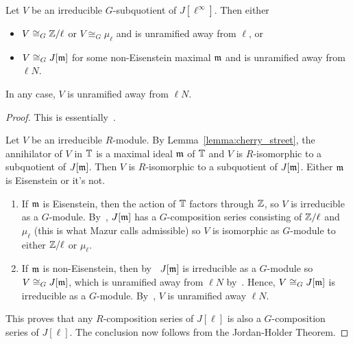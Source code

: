 \documentclass{article}
\begin{document}
\begin{theorem}[Mazur]\label{thm:irreducible_G_sub}
    Let $V$ be an irreducible $G$-subquotient of $J[\ell^\infty]$. Then either
    \begin{itemize}
        \item
            $V\cong_G \mathbb{Z}/\ell$ or $V\cong_G \mu_\ell$ and is unramified away
            from $\ell$, or
        \item 
            $V\cong_G J[\mathfrak{m}]$ for some non-Eisenstein maximal $\mathfrak{m}$ and is
            unramified away from $\ell N$.
    \end{itemize}
    In any case, $V$ is unramified away from $\ell N$.
\end{theorem}
\begin{proof}
    This is essentially~\cite[\S 14]{mazur:eisenstein}.

    Let $V$ be an irreducible $R$-module. By Lemma~\ref{lemma:cherry_street},
    the annihilator of $V$ in $\mathbb{T}$ is a maximal ideal $\mathfrak{m}$ of $\mathbb{T}$ and $V$ is
    $R$-isomorphic to a subquotient of $J[\mathfrak{m}]$. Then $V$ is $R$-isomorphic to a
    subquotient of $J[\mathfrak{m}]$. Either $\mathfrak{m}$ is Eisenstein or it's not.
    \begin{enumerate}
        \item
            If $\mathfrak{m}$ is Eisenstein, then the action of $\mathbb{T}$ factors through
            $\mathbb{Z}$, so $V$ is irreducible as a $G$-module. By~\cite[Proposition
            14.1]{mazur:eisenstein}, $J[\mathfrak{m}]$ has a $G$-composition series
            consisting of $\mathbb{Z}/\ell$ and $\mu_\ell$ (this is what Mazur calls
            admissible) so $V$ is isomorphic as $G$-module to either $\mathbb{Z}/\ell$
            or $\mu_\ell$.
        \item
            If $\mathfrak{m}$ is non-Eisenstein, then by~\cite[Proposition
            14.2]{mazur:eisenstein} $J[\mathfrak{m}]$ is irreducible as a $G$-module so
            $V\cong_G J[\mathfrak{m}]$, which is unramified away from $\ell N$
            by~\cite[Theorem 6.7]{deligne-serre}. Hence, $V\cong_G J[\mathfrak{m}]$ is
            irreducible as a $G$-module. By~\cite[Theorem 6.7]{deligne-serre},
            $V$ is unramified away $\ell N$.
    \end{enumerate}
    This proves that any $R$-composition series of $J[\ell]$ is also a
    $G$-composition series of $J[\ell]$. The conclusion now follows from the
    Jordan-Holder Theorem.
\end{proof} 
\end{document}
